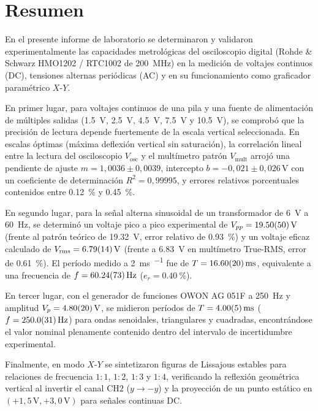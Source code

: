 
\section{Resumen}
\label{sec:resumen}

En el presente informe de laboratorio se determinaron y validaron experimentalmente las capacidades metrológicas del osciloscopio digital (Rohde \& Schwarz HMO1202 / RTC1002 de \qty{200}{\mega\hertz}) en la medición de voltajes continuos (DC), tensiones alternas periódicas (AC) y en su funcionamiento como graficador paramétrico $X$-$Y$.

En primer lugar, para voltajes continuos de una pila y una fuente de alimentación de múltiples salidas (\qty{1,5}{\volt}, \qty{2,5}{\volt}, \qty{4,5}{\volt}, \qty{7,5}{\volt} y \qty{10,5}{\volt}), se comprobó que la precisión de lectura depende fuertemente de la escala vertical seleccionada. En escalas óptimas (máxima deflexión vertical sin saturación), la correlación lineal entre la lectura del osciloscopio $V_{\text{osc}}$ y el multímetro patrón $V_{\text{mult}}$ arrojó una pendiente de ajuste $m = 1{,}0036 \pm 0{,}0039$, intercepto $b = -0{,}021 \pm 0{,}026\,\unit{\volt}$ con un coeficiente de determinación $R^2 = 0{,}99995$, y errores relativos porcentuales contenidos entre \qty{0,12}{\percent} y \qty{0,45}{\percent}.

En segundo lugar, para la señal alterna sinusoidal de un transformador de \qty{6}{\volt} a \qty{60}{\hertz}, se determinó un voltaje pico a pico experimental de $V_{pp} = \qty{19,50 \pm 0,50}{\volt}$ (frente al patrón teórico de \qty{19,32}{\volt}, error relativo de \qty{0,93}{\percent}) y un voltaje eficaz calculado de $V_{\text{rms}} = \qty{6,79 \pm 0,14}{\volt}$ (frente a \qty{6,83}{\volt} en multímetro True-RMS, error de \qty{0,61}{\percent}). El período medido a \qty{2}{\milli\second\per\division} fue de $T = \qty{16,60 \pm 0,20}{\milli\second}$, equivalente a una frecuencia de $f = \qty{60,24 \pm 0,73}{\hertz}$ ($e_r = \qty{0,40}{\percent}$).

En tercer lugar, con el generador de funciones OWON AG 051F a \qty{250}{\hertz} y amplitud $V_p = \qty{4,80 \pm 0,20}{\volt}$, se midieron períodos de $T = \qty{4,00 \pm 0,05}{\milli\second}$ ($f = \qty{250,0 \pm 3,1}{\hertz}$) para ondas senoidales, triangulares y cuadradas, encontrándose el valor nominal plenamente contenido dentro del intervalo de incertidumbre experimental.

Finalmente, en modo $X$-$Y$ se sintetizaron figuras de Lissajous estables para relaciones de frecuencia $1:1$, $1:2$, $1:3$ y $1:4$, verificando la reflexión geométrica vertical al invertir el canal $\text{CH2}$ ($y \to -y$) y la proyección de un punto estático en $(+1{,}5\,\unit{\volt}, +3{,}0\,\unit{\volt})$ para señales continuas DC.
